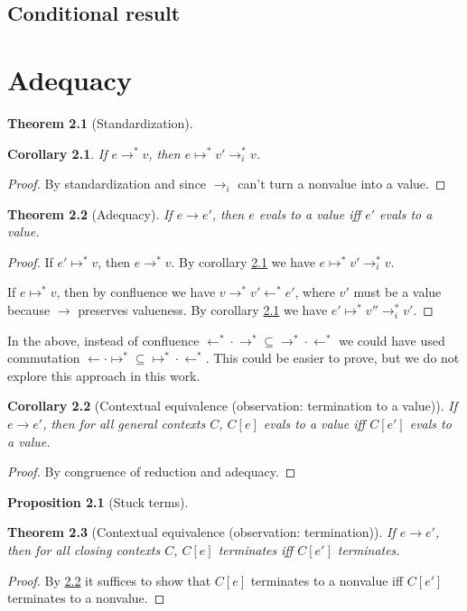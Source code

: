 \documentclass[a4paper, 11pt,titlepage, openright, twoside]{report}
\newcommand{\+}{\enspace}
\newtheorem{corollary}{Corollary}
\newtheorem{theorem}{Theorem}
\newtheorem{prop}{Proposition}
\begin{document}
\section{Conditional result}


\chapter{Adequacy}

\begin{theorem}[Standardization]
\end{theorem}
\begin{corollary} \label{stanv}%
	If $e →^* v$, then $e ↦^* v' →_i^* v$.
\end{corollary}
\begin{proof}
	By standardization and since $→_i$ can't turn a nonvalue into a value.
\end{proof}


\begin{theorem}[Adequacy]
	If $e → e'$, then $e$ evals to a value iff $e'$ evals to a value.
\end{theorem}
\begin{proof}
	If $e' ↦^* v$, then $e →^* v$. By corollary \ref{stanv} we have $e ↦^* v' →_i^* v$.

	If $e ↦^* v$, then by confluence we have $v →^* v' ←^* e'$, where $v'$ must be a value
	because $→$ preserves valueness. By corollary \ref{stanv} we have $e' ↦^* v'' →_i^* v'$.
\end{proof}

In the above, instead of confluence ${←^* · →^*} ⊆ {→^* · ←^*}$ we could have used
commutation ${← · ↦^*} ⊆ {↦^* · ←^*}$.
This could be easier to prove, but we do not explore this approach in this work.

\begin{corollary}[Contextual equivalence (observation: termination to a value)]
	\label{ctxeqv1}
	If $e → e'$, then for all general contexts $C$, $C[e]$ evals to a value iff $C[e']$ evals to a value.%
\end{corollary}
\begin{proof}
	By congruence of reduction and adequacy.
\end{proof}

\begin{prop}[Stuck terms]
\end{prop}

\begin{theorem}[Contextual equivalence (observation: termination)]
	If $e → e'$, then for all closing contexts $C$, $C[e]$ terminates iff $C[e']$ terminates.
\end{theorem}
\begin{proof}
	By \ref{ctxeqv1} it suffices to show that
	$C[e]$ terminates to a nonvalue iff $C[e']$ terminates to a nonvalue.
\end{proof}
\end{document}
